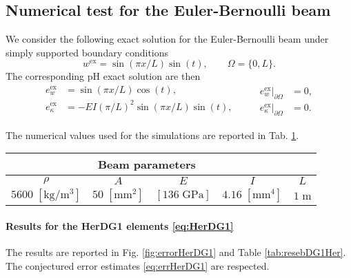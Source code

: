 \subsection{Numerical test for the Euler-Bernoulli beam}
We consider the following exact solution for the Euler-Bernoulli beam under simply supported boundary conditions
\begin{equation}
w^{\text{ex}} = \sin(\pi x/ L)\sin(t), \qquad \Omega = \{0, L\}.
\end{equation}
The corresponding pH exact solution are then
\begin{equation}
\begin{aligned}
e_w^{\text{ex}} &= \sin\left({\pi x}/{L}\right)\cos(t), \\
e_\kappa^{\text{ex}} &= - EI \left({\pi}/{L}\right)^2 \sin\left({\pi x}/{L}\right)\sin(t), \\
\end{aligned} \qquad 
\begin{aligned}
e_w^{\text{ex}}\vert_{\partial\Omega} &= 0, \\
e_\kappa^{\text{ex}}\vert_{\partial\Omega} &= 0.
\end{aligned}
\end{equation}

The numerical values used for the simulations are reported in Tab. \ref{tab:parEB}.

\begin{table}[htbp]
	\centering
	\begin{tabular}{ccccc}
		\hline 
		\multicolumn{4}{c}{Beam parameters} \\ 
		\hline 
		 $\rho$ & $A$ & $E$ & $I$ & $L$\\
		$5600\; [\textrm{kg}/\textrm{m}^3]$ & $50\; [\textrm{mm}^2]$ &  $[136 \; \textrm{GPa}]$ & $4.16\; [\textrm{mm}^4]$ & $1\; \textrm{m}$ \\ 
		\hline 
	\end{tabular} 
	\captionsetup{width=0.95\linewidth}
	\vspace{1mm}
	\label{tab:parEB}
\end{table}

\paragraph{Results for the HerDG1 elements \ref{eq:HerDG1}}
The results are reported in Fig. \ref{fig:errorHerDG1} and Table \ref{tab:resebDG1Her}. The conjectured error estimates \eqref{eq:errHerDG1} are respected.

